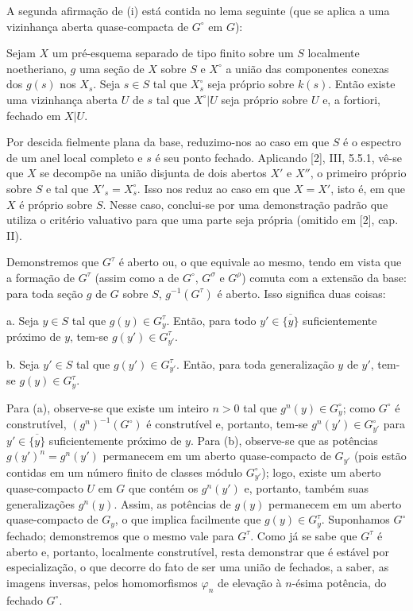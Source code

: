 A segunda afirmação de (i) está contida no lema seguinte (que se aplica a uma
vizinhança aberta quase-compacta de $G^\circ$ em $G$):

 Sejam $X$ um pré-esquema separado de tipo finito sobre um
$S$ localmente noetheriano, $g$ uma seção de $X$ sobre $S$ e $X^\circ$ a união
das componentes conexas dos $g(s)$ nos $X_s$. Seja $s\in S$ tal que
$X_s^\circ$ seja próprio sobre $k(s)$. Então existe uma vizinhança aberta $U$
de $s$ tal que $X^\circ|U$ seja próprio sobre $U$ e, a fortiori, fechado em
$X|U$.

Por descida fielmente plana da base, reduzimo-nos ao caso em que $S$ é o
espectro de um anel local completo e $s$ é seu ponto fechado. Aplicando [2],
III, 5.5.1, vê-se que $X$ se decompõe na união disjunta de dois abertos $X'$ e
$X''$, o primeiro próprio sobre $S$ e tal que $X'_s=X_s^\circ$. Isso nos reduz
ao caso em que $X=X'$, isto é, em que $X$ é próprio sobre $S$. Nesse caso,
conclui-se por uma demonstração padrão que utiliza o critério valuativo para
que uma parte seja própria (omitido em [2], cap. II).

Demonstremos que $G^\tau$ é aberto ou, o que equivale ao mesmo, tendo em vista
que a formação de $G^\tau$ (assim como a de $G^\circ$, $G^\sigma$ e $G^\rho$)
comuta com a extensão da base: para toda seção $g$ de $G$ sobre $S$,
$g^{-1}(G^\tau)$ é aberto. Isso significa duas coisas:

\medskip
\noindent a. Seja $y\in S$ tal que $g(y)\in G_y^\tau$. Então, para todo
$y'\in\overline{\{y\}}$ suficientemente próximo de $y$, tem-se
$g(y')\in G_{y'}^\tau$.

\medskip
\noindent b. Seja $y'\in S$ tal que $g(y')\in G_{y'}^\tau$. Então, para toda
generalização $y$ de $y'$, tem-se $g(y)\in G_y^\tau$.

Para (a), observe-se que existe um inteiro $n>0$ tal que
$g^n(y)\in G_y^\circ$; como $G^\circ$ é construtível,
$(g^n)^{-1}(G^\circ)$ é construtível e, portanto, tem-se
$g^n(y')\in G_{y'}^\circ$ para $y'\in\overline{\{y\}}$ suficientemente
próximo de $y$. Para (b), observe-se que as potências
$g(y')^n=g^n(y')$ permanecem em um aberto quase-compacto de $G_{y'}$ (pois
estão contidas em um número finito de classes módulo $G_{y'}^\circ$); logo,
existe um aberto quase-compacto $U$ em $G$ que contém os $g^n(y')$ e, portanto,
também suas generalizações $g^n(y)$. Assim, as potências de $g(y)$ permanecem
em um aberto quase-compacto de $G_y$, o que implica facilmente que
$g(y)\in G_y^\tau$.
Suponhamos $G^\circ$ fechado; demonstremos que o mesmo vale para $G^\tau$.
Como já se sabe que $G^\tau$ é aberto e, portanto, localmente construtível,
resta demonstrar que é estável por especialização, o que decorre do fato de ser
uma união de fechados, a saber, as imagens inversas, pelos homomorfismos
$\varphi_n$ de elevação à $n$-ésima potência, do fechado $G^\circ$.

